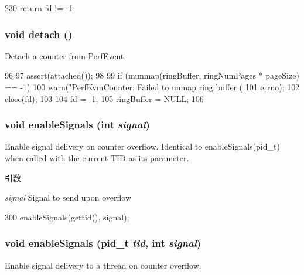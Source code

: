 \begin{DoxyCode}
230 { return fd != -1; }
\end{DoxyCode}
\hypertarget{classPerfKvmCounter_ac295bade8aee589f6718dfa79edc2a34}{
\subsubsection[{detach}]{\setlength{\rightskip}{0pt plus 5cm}void detach ()}}
\label{classPerfKvmCounter_ac295bade8aee589f6718dfa79edc2a34}
Detach a counter from PerfEvent. 


\begin{DoxyCode}
96 {
97     assert(attached());
98 
99     if (munmap(ringBuffer, ringNumPages * pageSize) == -1)
100         warn("PerfKvmCounter: Failed to unmap ring buffer (%
101              errno);
102     close(fd);
103 
104     fd = -1;
105     ringBuffer = NULL;
106 }
\end{DoxyCode}
\hypertarget{classPerfKvmCounter_ab176640bca1358eda4cd412c3be7d746}{
\subsubsection[{enableSignals}]{\setlength{\rightskip}{0pt plus 5cm}void enableSignals (int {\em signal})}}
\label{classPerfKvmCounter_ab176640bca1358eda4cd412c3be7d746}
Enable signal delivery on counter overflow. Identical to enableSignals(pid\_\-t) when called with the current TID as its parameter.


\begin{DoxyParams}{引数}
\item[{\em signal}]Signal to send upon overflow \end{DoxyParams}



\begin{DoxyCode}
300 { enableSignals(gettid(), signal); }
\end{DoxyCode}
\hypertarget{classPerfKvmCounter_adcb1192220b2f38f9e05b5c8a0f3ab30}{
\subsubsection[{enableSignals}]{\setlength{\rightskip}{0pt plus 5cm}void enableSignals (pid\_\-t {\em tid}, \/  int {\em signal})}}
\label{classPerfKvmCounter_adcb1192220b2f38f9e05b5c8a0f3ab30}
Enable signal delivery to a thread on counter overflow.


